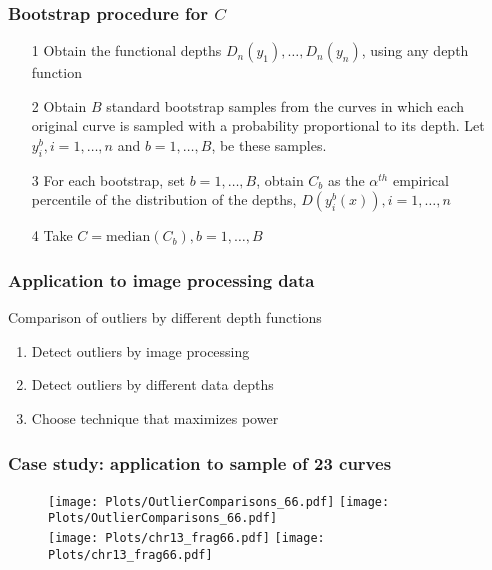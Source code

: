 \documentclass[10pt,dvipsnames,table]{beamer}
\begin{document}
\begin{frame}
\frametitle{Bootstrap procedure for $C$}
\begin{enumerate}
\item[1] Obtain the functional depths $D_n(y_1), \dots, D_n(y_n)$, using any depth function
\item[2] Obtain $B$ standard bootstrap samples from the curves in which each original curve is sampled with a probability proportional to its depth. Let $y_i^b, i = 1, \dots, n$ and $b = 1, \dots, B$, be these samples.
\item[3] For each bootstrap, set $b = 1, \dots, B$, obtain $C_b$ as the $\alpha^{th}$ empirical percentile of the distribution of the depths, $D(y_i^b(x)), i = 1, \dots, n$
\item[4] Take $C = \text{median}(C_b), b = 1, \dots, B$ 
\end{enumerate}
\end{frame}

\begin{frame}
\frametitle{Application to image processing data}
\Large
\begin{block}{Comparison of outliers by different depth functions}
\begin{enumerate}
\item Detect outliers by image processing
\item Detect outliers by different data depths
\item Choose technique that maximizes power
\end{enumerate}
\end{block}
\end{frame}

\begin{frame}
\frametitle{Case study: application to sample of 23 curves}
\vspace{-0.5cm}
\begin{figure}[t]
\texttt{[image: Plots/OutlierComparisons\_66.pdf]}
\hspace{0.5cm}
\texttt{[image: Plots/OutlierComparisons\_66.pdf]} \\
\texttt{[image: Plots/chr13\_frag66.pdf]}
\hspace{0.5cm}
\texttt{[image: Plots/chr13\_frag66.pdf]}
\end{figure}
\end{frame}
\end{document}
